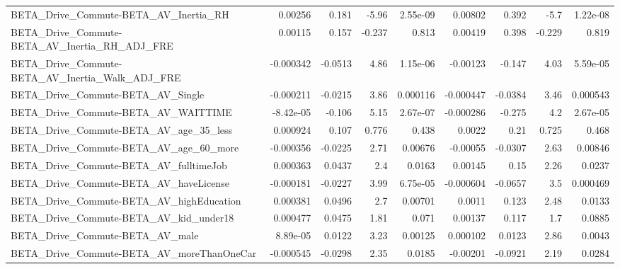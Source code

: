 \begin{tabular}{lrrrrrrrr}
BETA\_Drive\_Commute-BETA\_AV\_Inertia\_RH              &     0.00256 &        0.181 &    -5.96 & 2.55e-09 &    0.00802 &       0.392 &         -5.7 &      1.22e-08 \\
BETA\_Drive\_Commute-BETA\_AV\_Inertia\_RH\_ADJ\_FRE      &     0.00115 &        0.157 &   -0.237 &    0.813 &    0.00419 &       0.398 &       -0.229 &         0.819 \\
BETA\_Drive\_Commute-BETA\_AV\_Inertia\_Walk\_ADJ\_FRE    &   -0.000342 &      -0.0513 &     4.86 & 1.15e-06 &   -0.00123 &      -0.147 &         4.03 &      5.59e-05 \\
BETA\_Drive\_Commute-BETA\_AV\_Single                  &   -0.000211 &      -0.0215 &     3.86 & 0.000116 &  -0.000447 &     -0.0384 &         3.46 &      0.000543 \\
BETA\_Drive\_Commute-BETA\_AV\_WAITTIME                &   -8.42e-05 &       -0.106 &     5.15 & 2.67e-07 &  -0.000286 &      -0.275 &          4.2 &      2.67e-05 \\
BETA\_Drive\_Commute-BETA\_AV\_age\_35\_less             &    0.000924 &        0.107 &    0.776 &    0.438 &     0.0022 &        0.21 &        0.725 &         0.468 \\
BETA\_Drive\_Commute-BETA\_AV\_age\_60\_more             &   -0.000356 &      -0.0225 &     2.71 &  0.00676 &   -0.00055 &     -0.0307 &         2.63 &       0.00846 \\
BETA\_Drive\_Commute-BETA\_AV\_fulltimeJob             &    0.000363 &       0.0437 &      2.4 &   0.0163 &    0.00145 &        0.15 &         2.26 &        0.0237 \\
BETA\_Drive\_Commute-BETA\_AV\_haveLicense             &   -0.000181 &      -0.0227 &     3.99 & 6.75e-05 &  -0.000604 &     -0.0657 &          3.5 &      0.000469 \\
BETA\_Drive\_Commute-BETA\_AV\_highEducation           &    0.000381 &       0.0496 &      2.7 &  0.00701 &     0.0011 &       0.123 &         2.48 &        0.0133 \\
BETA\_Drive\_Commute-BETA\_AV\_kid\_under18             &    0.000477 &       0.0475 &     1.81 &    0.071 &    0.00137 &       0.117 &          1.7 &        0.0885 \\
BETA\_Drive\_Commute-BETA\_AV\_male                    &    8.89e-05 &       0.0122 &     3.23 &  0.00125 &   0.000102 &      0.0123 &         2.86 &        0.0043 \\
BETA\_Drive\_Commute-BETA\_AV\_moreThanOneCar          &   -0.000545 &      -0.0298 &     2.35 &   0.0185 &   -0.00201 &     -0.0921 &         2.19 &        0.0284 \\

\end{tabular}
